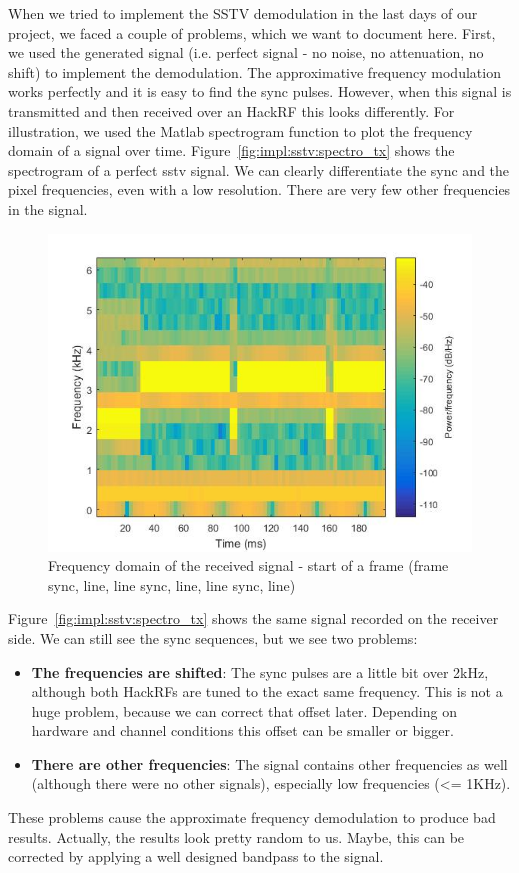 When we tried to implement the SSTV demodulation in the last days of our project, we faced a couple of problems, which we want to document here. First, we used the generated signal (i.e. perfect signal - no noise, no attenuation, no shift) to implement the demodulation. The approximative frequency modulation works perfectly and it is easy to find the sync pulses. However, when this signal is transmitted and then received over an HackRF this looks differently. For illustration, we used the Matlab spectrogram function to plot the frequency domain of a signal over time. Figure~\ref{fig:impl:sstv:spectro_tx} shows the spectrogram of a perfect sstv signal. We can clearly differentiate the sync and the pixel frequencies, even with a low resolution. There are very few other frequencies in the signal. 

\begin{figure}
	\centering
	\includegraphics[width=1.0\linewidth]{gfx/sstv_rxside.jpg}
	\caption{Frequency domain of the received signal - start of a frame (frame sync, line, line sync, line, line sync, line)}
	\label{fig:impl:sstv:spectro_rx}
\end{figure}

Figure~\ref{fig:impl:sstv:spectro_tx} shows the same signal recorded on the receiver side. We can still see the sync sequences, but we see two problems: 
\begin{itemize}
	\item \textbf{The frequencies are shifted}: The sync pulses are a little bit over 2kHz, although both HackRFs are tuned to the exact same frequency. This is not a huge problem, because we can correct that offset later. Depending on hardware and channel conditions this offset can be smaller or bigger. 
	\item \textbf{There are other frequencies}: The signal contains other frequencies as well (although there were no other signals), especially low frequencies (<= 1KHz). 
\end{itemize}

These problems cause the approximate frequency demodulation to produce bad results. Actually, the results look pretty random to us. Maybe, this can be corrected by applying a well designed bandpass to the signal. 

